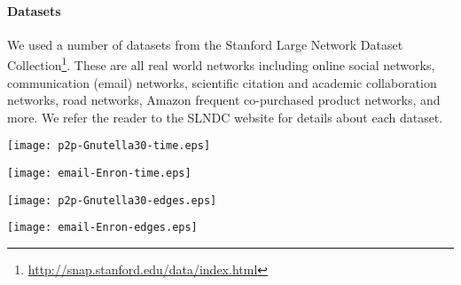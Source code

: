 \paragraph{Datasets} We used a number of datasets from the Stanford Large
Network Dataset Collection\footnote{\url{http://snap.stanford.edu/data/index.html}}. 
These are all real world networks including online social networks, communication (email)
networks, scientific citation and academic collaboration networks, road
networks, Amazon frequent co-purchased product networks, and more. 
We refer the reader to the SLNDC website for details about each dataset.



\begin{figure*}
\begin{minipage}[b]{0.5\linewidth}
\flushleft
\texttt{[image: p2p-Gnutella30-time.eps]}
\caption{-} \label{fig:gnutella:time}
\end{minipage}%
\begin{minipage}[b]{0.5\linewidth}
\centering
\texttt{[image: email-Enron-time.eps]}
\caption{-} \label{fig:email:time}
\end{minipage}
\end{figure*}
\begin{figure*}
\begin{minipage}[b]{0.5\linewidth}
\flushleft
\texttt{[image: p2p-Gnutella30-edges.eps]}
\caption{-} \label{fig:gnutella:edges}
\end{minipage}%
\begin{minipage}[b]{0.5\linewidth}
\centering
\texttt{[image: email-Enron-edges.eps]}
\caption{-} \label{fig:email:edges}
\end{minipage}
\end{figure*}



